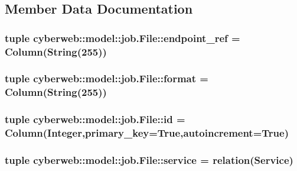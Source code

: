 \subsection{\-Member \-Data \-Documentation}
\hypertarget{classcyberweb_1_1model_1_1job_1_1_file_a6d0fae156bd6295c007be75da2f6bf38}{
\subsubsection[{endpoint\-\_\-ref}]{\setlength{\rightskip}{0pt plus 5cm}tuple {\bf cyberweb\-::model\-::job.\-File\-::endpoint\-\_\-ref} = \-Column(\-String(255))}}\label{classcyberweb_1_1model_1_1job_1_1_file_a6d0fae156bd6295c007be75da2f6bf38}
\hypertarget{classcyberweb_1_1model_1_1job_1_1_file_a418553bb8f4f82a639c52381e43463aa}{
\subsubsection[{format}]{\setlength{\rightskip}{0pt plus 5cm}tuple {\bf cyberweb\-::model\-::job.\-File\-::format} = \-Column(\-String(255))}}\label{classcyberweb_1_1model_1_1job_1_1_file_a418553bb8f4f82a639c52381e43463aa}
\hypertarget{classcyberweb_1_1model_1_1job_1_1_file_ac470f316fdbba692bad0b8ea0f6d756a}{
\subsubsection[{id}]{\setlength{\rightskip}{0pt plus 5cm}tuple {\bf cyberweb\-::model\-::job.\-File\-::id} = \-Column(\-Integer,primary\-\_\-key=\-True,autoincrement=\-True)}}\label{classcyberweb_1_1model_1_1job_1_1_file_ac470f316fdbba692bad0b8ea0f6d756a}
\hypertarget{classcyberweb_1_1model_1_1job_1_1_file_af9f74a90be41957ce9f09f86c6981fd7}{
\subsubsection[{service}]{\setlength{\rightskip}{0pt plus 5cm}tuple {\bf cyberweb\-::model\-::job.\-File\-::service} = relation(\-Service)}}\label{classcyberweb_1_1model_1_1job_1_1_file_af9f74a90be41957ce9f09f86c6981fd7}
